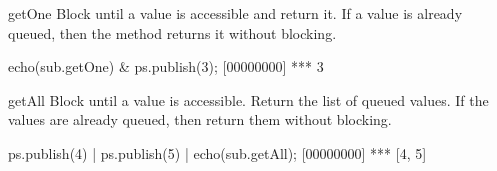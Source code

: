 \begin{urbiscriptapi}

\item[getOne]
  Block until a value is accessible and return it.  If a value is already
  queued, then the method returns it without blocking.

\begin{urbiscript}
echo(sub.getOne) &
ps.publish(3);
[00000000] *** 3
\end{urbiscript}


\item[getAll] Block until a value is accessible.  Return the list of
  queued values.  If the values are already queued, then return them
  without blocking.

\begin{urbiscript}
ps.publish(4) |
ps.publish(5) |
echo(sub.getAll);
[00000000] *** [4, 5]
\end{urbiscript}

\end{urbiscriptapi}

